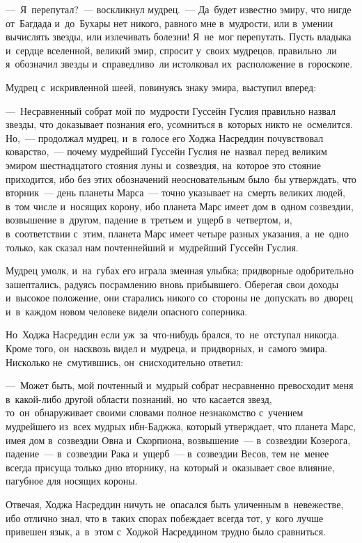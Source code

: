 \documentclass[12pt,a4paper]{book}
\begin{document}
—~Я~перепутал?~— воскликнул мудрец.~— Да~будет известно эмиру, что нигде от~Багдада и~до~Бухары нет никого, равного мне в~мудрости, или в~умении вычислять звезды, или излечивать болезни! Я~не~мог перепутать. Пусть владыка и~сердце вселенной, великий эмир, спросит у~своих мудрецов, правильно~ли я~обозначил звезды и~справедливо~ли истолковал их~расположение в~гороскопе.

Мудрец с~искривленной шеей, повинуясь знаку эмира, выступил вперед:

—~Несравненный собрат мой по~мудрости Гуссейн Гуслия правильно назвал звезды, что доказывает познания его, усомниться в~которых никто не~осмелится. Но,~— продолжал мудрец, и~в~голосе его Ходжа Насреддин почувствовал коварство,~— почему мудрейший Гуссейн Гуслия не~назвал перед великим эмиром шестнадцатого стояния луны и~созвездия, на~которое это стояние приходится, ибо без этих обозначений неосновательным было~бы утверждать, что вторник~— день планеты Марса~— точно указывает на~смерть великих людей, в~том числе и~носящих корону, ибо планета Марс имеет дом в~одном созвездии, возвышение в~другом, падение в~третьем и~ущерб в~четвертом, и, в~соответствии с~этим, планета Марс имеет четыре разных указания, а~не~одно только, как сказал нам почтеннейший и~мудрейший Гуссейн Гуслия.

Мудрец умолк, и~на~губах его играла змеиная улыбка; придворные одобрительно зашептались, радуясь посрамлению вновь прибывшего. Оберегая свои доходы и~высокое положение, они старались никого со~стороны не~допускать во~дворец и~в~каждом новом человеке видели опасного соперника.

Но~Ходжа Насреддин если уж~за~что-нибудь брался, то~не~отступал никогда. Кроме того, он~насквозь видел и~мудреца, и~придворных, и~самого эмира. Нисколько не~смутившись, он~снисходительно ответил:

—~Может быть, мой почтенный и~мудрый собрат несравненно превосходит меня в~какой-либо другой области познаний, но~что касается звезд, то~он~обнаруживает своими словами полное незнакомство с~учением мудрейшего из~всех мудрых ибн-Баджжа, который утверждает, что планета Марс, имея дом в~созвездии Овна и~Скорпиона, возвышение~— в~созвездии Козерога, падение~— в~созвездии Рака и~ущерб~— в~созвездии Весов, тем не~менее всегда присуща только дню вторнику, на~который и~оказывает свое влияние, пагубное для носящих короны.

Отвечая, Ходжа Насреддин ничуть не~опасался быть уличенным в~невежестве, ибо отлично знал, что в~таких спорах побеждает всегда тот, у~кого лучше привешен язык, а~в~этом с~Ходжой Насреддином трудно было сравниться.
\end{document}
